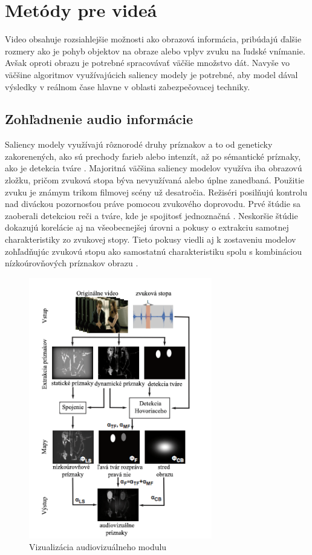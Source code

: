 \section{Metódy pre videá}
Video obsahuje rozsiahlejšie možnosti ako obrazová informácia, pribúdajú ďalšie rozmery ako je pohyb objektov na obraze alebo vplyv zvuku na ľudské vnímanie.
Avšak oproti obrazu je potrebné spracovávať väčšie množstvo dát.
Navyše vo väčšine algoritmov využívajúcich saliency modely je potrebné, aby model dával výsledky v reálnom čase hlavne v oblasti zabezpečovacej techniky.
\subsection{Zohľadnenie audio informácie}
Saliency modely využívajú rôznorodé druhy príznakov a to od geneticky zakorenených, ako sú prechody farieb alebo intenzít, až po sémantické príznaky, ako je detekcia tváre \cite{salient-faces}.
Majoritná väčšina saliency modelov využíva iba obrazovú zložku, pričom zvuková stopa býva nevyužívaná alebo úplne zanedbaná.
Použitie zvuku je známym trikom filmovej scény už desatročia.
Režiséri posilňujú kontrolu nad diváckou pozornosťou práve pomocou zvukového doprovodu.
Prvé štúdie sa zaoberali detekciou reči a tváre, kde je spojitosť jednoznačná \cite{sound-1}.
Neskoršie štúdie dokazujú korelácie aj na všeobecnejšej úrovni a pokusy o extrakciu samotnej charakteristiky zo zvukovej stopy\cite{sound-coutrot-1}.
Tieto pokusy viedli aj k zostaveniu modelov zohľadňujúc zvukovú stopu ako samostatnú charakteristiku spolu s kombináciou nízkoúrovňových príznakov obrazu \cite{sound-courot-2}.

\begin{figure}[H]
  \centering
  \includegraphics[width=8cm]{pics/courot-1.png}
  \caption{Vizualizácia audiovizuálneho modulu\cite{sound-courot-2}}\label{wrap-fig:4}
\end{figure}
\vspace{10mm}

